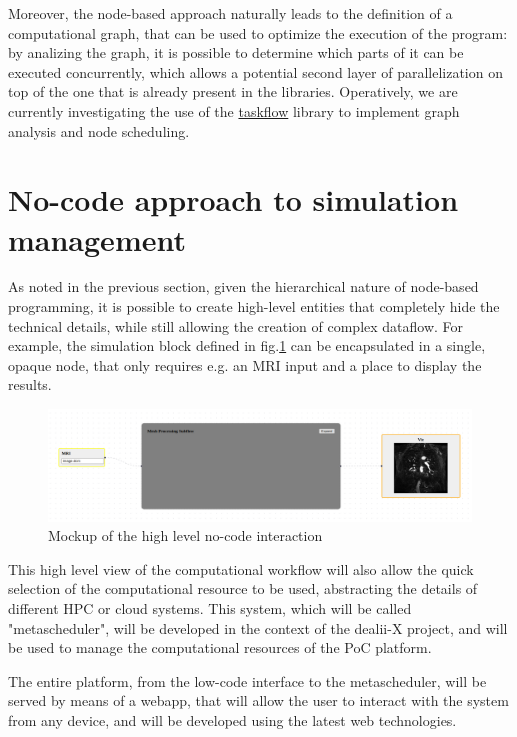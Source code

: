 \documentclass[a4paper,12pt]{article}
\begin{document}
Moreover, the node-based approach naturally leads to the definition of a computational graph, that can be used to optimize the execution of the program: by analizing the graph, it is possible to determine which parts of it can be executed concurrently, which allows a potential second layer of parallelization on top of the one that is already present in the libraries. Operatively, we are currently investigating the use of the \href{https://github.com/taskflow/taskflow}{taskflow} library to implement graph analysis and node scheduling.   

\section{\textcolor{EUblue}{No-code approach to simulation management}}

As noted in the previous section, given the hierarchical nature of node-based programming, it is possible to create high-level entities that completely hide the technical details, while still allowing the creation of complex dataflow. For example, the simulation block defined in fig.\ref{nocode-sim} can be encapsulated in a single, opaque node, that only requires e.g. an MRI input and a place to display the results. 

\begin{figure}
    \label{nocode-sim}
    \includegraphics[width=400pt]{nocode-sim.png}
    \caption{Mockup of the high level no-code interaction}
\end{figure}


This high level view of the computational workflow will also allow the quick selection of the computational resource to be used, abstracting the details of different HPC or cloud systems. This system, which will be called "metascheduler", will be developed in the context of the dealii-X project, and will be used to manage the computational resources of the PoC platform.

The entire platform, from the low-code interface to the metascheduler, will be served by means of a webapp, that will allow the user to interact with the system from any device, and will be developed using the latest web technologies. 
\end{document}
